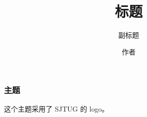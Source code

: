 \documentclass{ctexbeamer}
\begin{document}
\title{标题}
\subtitle{副标题}
\author{作者}
\maketitle
\begin{frame}
  \frametitle{\sjtugtext 主题}
  这个主题采用了 SJTUG 的 logo。
\end{frame}
\makebottom
\end{document}
